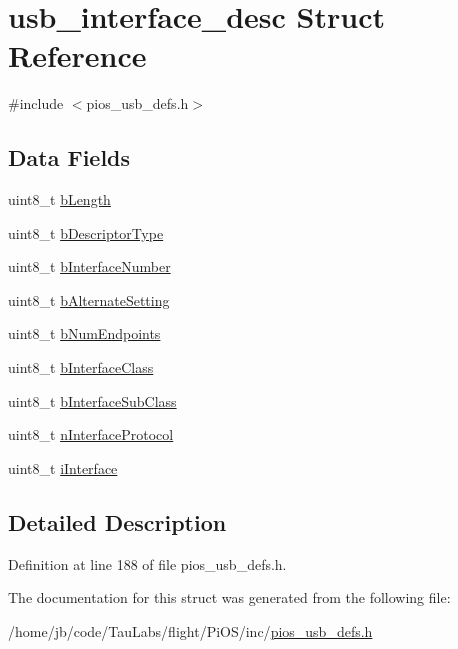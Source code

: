 \hypertarget{structusb__interface__desc}{\section{usb\-\_\-interface\-\_\-desc \-Struct \-Reference}
\label{structusb__interface__desc}
}


{\ttfamily \#include $<$pios\-\_\-usb\-\_\-defs.\-h$>$}

\subsection*{\-Data \-Fields}
\begin{DoxyCompactItemize}
\item 
uint8\-\_\-t \hyperlink{group___p_i_o_s___u_s_b___d_e_f_s_gaa4b60d12645813f528deae9301fe2103}{b\-Length}
\item 
uint8\-\_\-t \hyperlink{group___p_i_o_s___u_s_b___d_e_f_s_ga324795326b03fff1d5c298b8dde76dc9}{b\-Descriptor\-Type}
\item 
uint8\-\_\-t \hyperlink{group___p_i_o_s___u_s_b___d_e_f_s_ga18e33c3c1b7bf4ea4cff62e4d603afd9}{b\-Interface\-Number}
\item 
uint8\-\_\-t \hyperlink{group___p_i_o_s___u_s_b___d_e_f_s_ga9fd5069255e2ed4e8c8bee39fd5c3e19}{b\-Alternate\-Setting}
\item 
uint8\-\_\-t \hyperlink{group___p_i_o_s___u_s_b___d_e_f_s_ga685562326d8af1c5eccd71bdb2794cd1}{b\-Num\-Endpoints}
\item 
uint8\-\_\-t \hyperlink{group___p_i_o_s___u_s_b___d_e_f_s_ga01e526f1b9ab4ee18ebeb28b17a5f7e8}{b\-Interface\-Class}
\item 
uint8\-\_\-t \hyperlink{group___p_i_o_s___u_s_b___d_e_f_s_gaf937eb2ea941b0470ccd69ae9c5478ac}{b\-Interface\-Sub\-Class}
\item 
uint8\-\_\-t \hyperlink{group___p_i_o_s___u_s_b___d_e_f_s_ga1e2e09e7b88f6a84a53129afefdc75d3}{n\-Interface\-Protocol}
\item 
uint8\-\_\-t \hyperlink{group___p_i_o_s___u_s_b___d_e_f_s_ga93404aa8e9b859c2759b7a02b6533222}{i\-Interface}
\end{DoxyCompactItemize}


\subsection{\-Detailed \-Description}


\-Definition at line 188 of file pios\-\_\-usb\-\_\-defs.\-h.



\-The documentation for this struct was generated from the following file\-:\begin{DoxyCompactItemize}
\item 
/home/jb/code/\-Tau\-Labs/flight/\-Pi\-O\-S/inc/\hyperlink{pios__usb__defs_8h}{pios\-\_\-usb\-\_\-defs.\-h}\end{DoxyCompactItemize}

